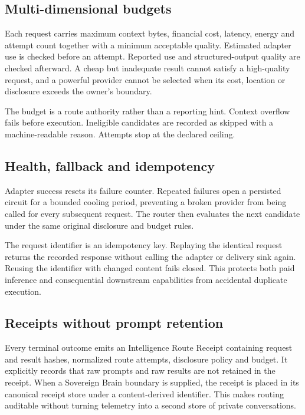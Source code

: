 \subsection{Multi-dimensional budgets}

Each request carries maximum context bytes, financial cost, latency, energy and
attempt count together with a minimum acceptable quality.  Estimated adapter use is
checked before an attempt.  Reported use and structured-output quality are checked
afterward.  A cheap but inadequate result cannot satisfy a high-quality request, and
a powerful provider cannot be selected when its cost, location or disclosure exceeds
the owner's boundary.

The budget is a route authority rather than a reporting hint.  Context overflow fails
before execution.  Ineligible candidates are recorded as skipped with a machine-readable
reason.  Attempts stop at the declared ceiling.

\subsection{Health, fallback and idempotency}

Adapter success resets its failure counter.  Repeated failures open a persisted
circuit for a bounded cooling period, preventing a broken provider from being called
for every subsequent request.  The router then evaluates the next candidate under
the same original disclosure and budget rules.

The request identifier is an idempotency key.  Replaying the identical request returns
the recorded response without calling the adapter or delivery sink again.  Reusing the
identifier with changed content fails closed.  This protects both paid inference and
consequential downstream capabilities from accidental duplicate execution.

\subsection{Receipts without prompt retention}

Every terminal outcome emits an Intelligence Route Receipt containing request and
result hashes, normalized route attempts, disclosure policy and budget.  It explicitly
records that raw prompts and raw results are not retained in the receipt.  When a
Sovereign Brain boundary is supplied, the receipt is placed in its canonical receipt
store under a content-derived identifier.  This makes routing auditable without
turning telemetry into a second store of private conversations.

